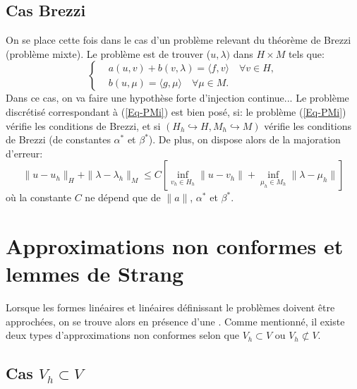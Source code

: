 \subsection{Cas Brezzi}
On se place cette fois dans le cas d'un problème relevant du théorème de Brezzi
(problème mixte).
Le problème est de trouver ($u, \lambda)$ dans $H\times M$ tels que:
 \begin{equation}\label{Eq-PMi}
\left\{
\begin{aligned}
 &a(u,v) + b(v, \lambda) = \langle f,v\rangle \quad \forall v\in H,\\
&b(u,\mu) = \langle g,\mu\rangle \quad \forall \mu \in M.
\end{aligned}\right.
\end{equation}
\medskip
Dans ce cas, on va faire une hypothèse forte d'injection continue...
\medskip
Le problème discrétisé correspondant à (\ref{Eq-PMi}) est bien posé, si:
le problème (\ref{Eq-PMi}) vérifie les conditions de Brezzi, et si
$(H_h\hookrightarrow H, M_h\hookrightarrow M)$ vérifie les conditions de
Brezzi (de constantes $\alpha^*$ et $\beta^*$).
\medskip
De plus, on dispose alors de la majoration d'erreur:
\begin{equation}
\|u-u_h\|_H + \|\lambda-\lambda_h\|_M \le C\left[
\inf_{v_h\in H_h} \|u-v_h\|
+ \inf_{\mu_h\in M_h} \|\lambda-\mu_h\|
\right]
\end{equation}
où la constante $C$ ne dépend que de $\|a\|$, $\alpha^*$ et
$\beta^*$.


\medskip
\section{Approximations non conformes et lemmes de Strang}

Lorsque les formes linéaires et linéaires définissant le problèmes doivent
être approchées, on se trouve alors en présence d'une .
Comme mentionné, il existe deux types d'approximations non conformes selon que
$V_h\subset V$ ou $V_h\not\subset V$.
\medskip
\subsection{Cas $V_h\subset V$}

